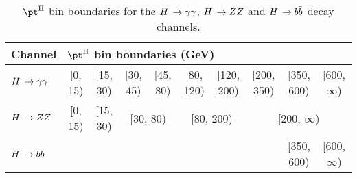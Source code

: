 
\begin{table}[htbH]
\footnotesize
\begin{center}
\begin{tabular}{|l|c|c|c|c|c|c|c|c|c|}
\hline
Channel & \multicolumn{9}{l|}{$\pth$ bin boundaries (GeV)} \\
\hline
$H\,\to\gamma\gamma$
    & [0, 15)    & [15, 30)   & [30, 45)   & [45, 80)        & [80, 120)
    & [120, 200) & [200, 350) & [350, 600) & [600, $\infty$)
    \\
\hline    
$H\,\to ZZ$
    & [0, 15) & [15, 30) & \multicolumn{2}{c|}{[30, 80)}
    & \multicolumn{2}{c|}{[80, 200)} & \multicolumn{3}{c|}{[200, $\infty$)}
    \\
\hline
$H\,\to b\bar{b}$
    & \multicolumn{7}{c|}{} & [350, 600) & [600, $\infty$)
    \\
\hline
\end{tabular}
\end{center}
\caption{
    $\pth$ bin boundaries for the $H\,\to\gamma\gamma$, $H\,\to ZZ$ and $H\,\to b\bar{b}$ decay channels.
    }
\label{tab:binningpth}
\end{table}

